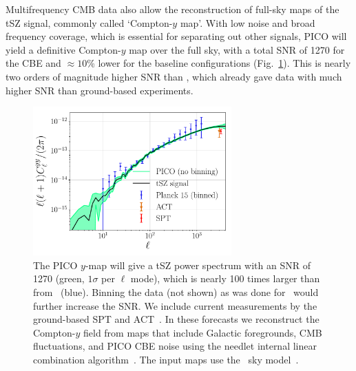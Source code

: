 \documentclass[PICOReport.tex]{subfiles}
\begin{document}
Multifrequency \ac{CMB} data also allow the reconstruction of full-sky maps of the tSZ signal, commonly called  \lq Compton-$y$ map\rq. With low noise and broad frequency coverage, which is essential for separating out other signals, PICO will yield a definitive Compton-$y$ map over the full sky, with a total \ac{SNR} of 1270 for the CBE and $\approx 10$\% lower for the baseline configurations (Fig.~\ref{fig:PICO_tSZ_PS}). This is nearly two orders of magnitude higher \ac{SNR} than \planck , which already gave data with much higher \ac{SNR} than ground-based experiments. 
\begin{figure}[h]
\hspace{-0.1in}
\parbox{3.1in}{\centerline{
\includegraphics[width=3.0in]{images/PICO_tSZ_PS_plot.pdf} } }
\hspace{0.in}
\parbox{3.4in}{
\caption{\captiontext  
The PICO $y$-map will give a tSZ power spectrum with an \ac{SNR} of 1270 (green, $1\sigma$ per $\ell$ mode), which is nearly 100 times larger than from \planck\ (blue). Binning the data (not shown) as was done for \planck\ would further increase the \ac{SNR}.  We include current measurements by the ground-based SPT and ACT~\citep{Sievers2013,George2015}. In these forecasts we reconstruct the Compton-$y$ field from maps that include Galactic foregrounds, CMB fluctuations, and PICO CBE noise using the needlet internal linear combination algorithm~\citep{Delabrouille2009}. The input maps use the \planck~sky model~\cite{psm?}.
\label{fig:PICO_tSZ_PS} 
} }
\vspace{-0.1in}
\end{figure}
\end{document}
